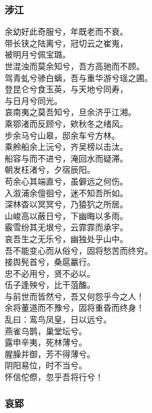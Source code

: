 \documentclass[]{article}
\begin{document}
\hypertarget{header-n85}{%
\subsubsection{涉江}\label{header-n85}}

余幼好此奇服兮，年既老而不衰。\\
带长铗之陆离兮，冠切云之崔嵬，\\
被明月兮佩宝璐。\\
世混浊而莫余知兮，吾方高驰而不顾。\\
驾青虬兮骖白螭，吾与重华游兮瑶之圃。\\
登昆仑兮食玉英，与天地兮同寿，\\
与日月兮同光。\\
哀南夷之莫吾知兮，旦余济乎江湘。\\
乘鄂渚而反顾兮，欸秋冬之绪风。\\
步余马兮山皋，邸余车兮方林。\\
乘舲船余上沅兮，齐吴榜以击汰。\\
船容与而不进兮，淹回水而疑滞。\\
朝发枉渚兮，夕宿辰阳。\\
苟余心其端直兮，虽僻远之何伤。\\
入溆浦余儃徊兮，迷不知吾所如。\\
深林杳以冥冥兮，乃猿狖之所居。\\
山峻高以蔽日兮，下幽晦以多雨。\\
霰雪纷其无垠兮，云霏霏而承宇。\\
哀吾生之无乐兮，幽独处乎山中。\\
吾不能变心而从俗兮，固将愁苦而终穷。\\
接舆髡首兮，桑扈臝行。\\
忠不必用兮，贤不必以。\\
伍子逢殃兮，比干菹醢。\\
与前世而皆然兮，吾又何怨乎今之人！\\
余将董道而不豫兮，固将重昏而终身！\\
乱曰：鸾鸟凤皇，日以远兮。\\
燕雀乌鹊，巢堂坛兮。\\
露申辛夷，死林薄兮。\\
腥臊并御，芳不得薄兮。\\
阴阳易位，时不当兮。\\
怀信佗傺，忽乎吾将行兮！

\hypertarget{header-n90}{%
\subsubsection{哀郢}\label{header-n90}}
\end{document}

